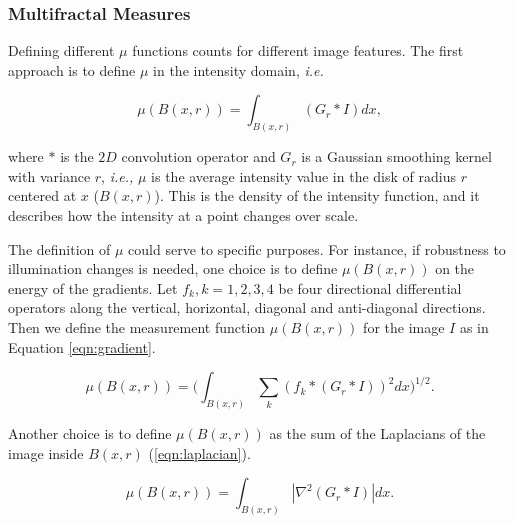 \subsubsection{Multifractal Measures}
Defining different $\mu$ functions counts for different image features. The first approach is to define $\mu$ in the intensity domain, {\em i.e.}

\begin{equation}
\mu(B(x,r)) = \int_{B(x,r)}{(G_{r} \ast I)} dx,
\label{eqn:eqn11}
\end{equation}

where $\ast$ is the $2D$ convolution operator and $G_{r}$ is a Gaussian smoothing kernel with variance $r$, {\em i.e., } $\mu$ is the average intensity value in the disk of radius $r$ centered at $x$ ($B(x,r)$). This is the density of the intensity function, and it describes how the intensity at a point changes over scale.

The definition of $\mu$ could serve to specific purposes. For instance, if robustness to illumination changes is needed, one choice is to define $\mu(B(x,r))$ on the energy of the gradients. Let ${ f_{k} , k = 1, 2, 3, 4}$ be four directional differential operators along the vertical, horizontal, diagonal and anti-diagonal directions. Then we define the measurement function $\mu(B(x,r))$ for the image $I$ as in Equation \ref{eqn:gradient}.

\begin{equation}
\mu(B(x,r)) = (\int_{B(x,r)}{\sum_{k}{(f_{k} \ast (G_{r} \ast I))^{2}} dx)^{1/2}}.
\label{eqn:gradient}
\end{equation}

Another choice is to define $μ(B(x, r))$ as the sum of the Laplacians of the image inside $B(x, r)$ (\ref{eqn:laplacian}).

\begin{equation}
\mu(B(x,r)) = \int_{B(x,r)}|\nabla^2 (G_{r} \ast I)| dx.
\label{eqn:laplacian}
\end{equation}

